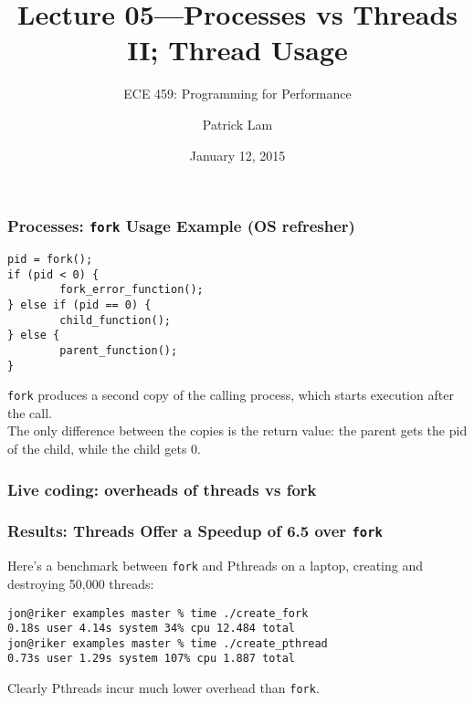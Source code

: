 \documentclass[aspectratio=43]{beamer}
\title{Lecture 05---Processes vs Threads II; Thread Usage}
\subtitle{ECE 459: Programming for Performance}
\author{Patrick Lam}
\institute{University of Waterloo}
\date{January 12, 2015}
\newenvironment{changemargin}[1]{%
  \begin{list}{}{%
    \setlength{\topsep}{0pt}%
    \setlength{\leftmargin}{#1}%
    \setlength{\rightmargin}{1em}
    \setlength{\listparindent}{\parindent}%
    \setlength{\itemindent}{\parindent}%
    \setlength{\parsep}{\parskip}%
  }%
  \item[]}{\end{list}}
\begin{document}
\begin{frame}[plain]
  \titlepage
\end{frame}

\begin{frame}[fragile]
  \frametitle{Processes: {\tt fork} Usage Example (OS refresher)}

  \begin{changemargin}{3cm}
    \begin{minipage}{.5\textwidth}
\begin{lstlisting}
pid = fork();
if (pid < 0) {
        fork_error_function();
} else if (pid == 0) {
        child_function();
} else {
        parent_function();
}
\end{lstlisting}
    \end{minipage}
  \end{changemargin}

  \begin{changemargin}{1cm}
     {\tt fork} produces a second copy of the calling process, which starts
          execution after the call.\\[1em]

    The only difference between the copies is the return value: the parent gets the pid of
          the child, while the child gets 0.
  \end{changemargin}
\end{frame}

\begin{frame}[fragile]
  \frametitle{Live coding: overheads of threads vs fork}
\end{frame}

\begin{frame}[fragile]
  \frametitle{Results: Threads Offer a Speedup of 6.5 over {\tt fork}}

  \begin{changemargin}{1cm}
  Here's a benchmark between {\tt fork} and Pthreads on a laptop, creating and
  destroying 50,000 threads:
  \vfill
  \begin{lstlisting}[basicstyle=\scriptsize]
jon@riker examples master % time ./create_fork 
0.18s user 4.14s system 34% cpu 12.484 total
jon@riker examples master % time ./create_pthread 
0.73s user 1.29s system 107% cpu 1.887 total
  \end{lstlisting}
  \vfill
  Clearly Pthreads incur much lower overhead than {\tt fork}.
  \end{changemargin}
\end{frame}
\end{document}
